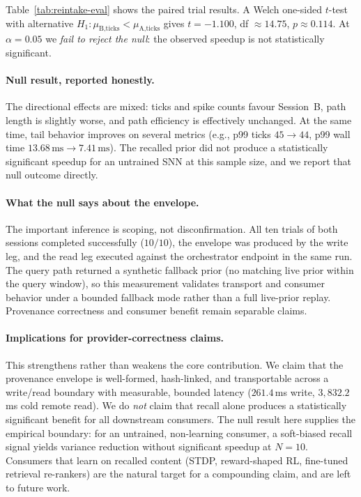 \documentclass[conference]{IEEEtran}
\begin{document}
Table~\ref{tab:reintake-eval} shows the paired trial results. A Welch
one-sided $t$-test with alternative $H_1: \mu_{\text{B,ticks}} <
\mu_{\text{A,ticks}}$ gives $t = -1.100$, df $\approx 14.75$, $p
\approx 0.114$. At $\alpha = 0.05$ we \emph{fail to reject the null}:
the observed speedup is not statistically significant.

\paragraph{Null result, reported honestly.}
The directional effects are mixed: ticks and spike counts favour
Session~B, path length is slightly worse, and path efficiency is
effectively unchanged. At the same time, tail behavior improves on
several metrics (e.g., p99 ticks $45 \to 44$, p99 wall time
$13.68\,\mathrm{ms} \to 7.41\,\mathrm{ms}$). The recalled prior did not
produce a statistically significant speedup for an untrained SNN at this
sample size, and we report that null outcome directly.

\paragraph{What the null says about the envelope.}
The important inference is scoping, not disconfirmation. All ten
trials of both sessions completed successfully ($10/10$), the envelope
was produced by the write leg, and the read leg executed against the
orchestrator endpoint in the same run. The query path returned a
synthetic fallback prior (no matching live prior within the query window),
so this measurement validates transport and consumer behavior under a
bounded fallback mode rather than a full live-prior replay. Provenance
correctness and consumer benefit remain separable claims.

\paragraph{Implications for provider-correctness claims.}
This strengthens rather than weakens the core contribution. We claim
that the provenance envelope is well-formed, hash-linked, and
transportable across a write/read boundary with measurable, bounded
latency ($261.4$\,ms write, $3{,}832.2$\,ms cold remote read). We do
\emph{not} claim that recall alone produces a statistically significant
benefit for all downstream consumers. The null result here supplies
the empirical boundary: for an untrained, non-learning consumer, a
soft-biased recall signal yields variance reduction without significant
speedup at $N=10$. Consumers that learn on recalled content (STDP,
reward-shaped RL, fine-tuned retrieval re-rankers) are the natural
target for a compounding claim, and are left to future work.
\end{document}
